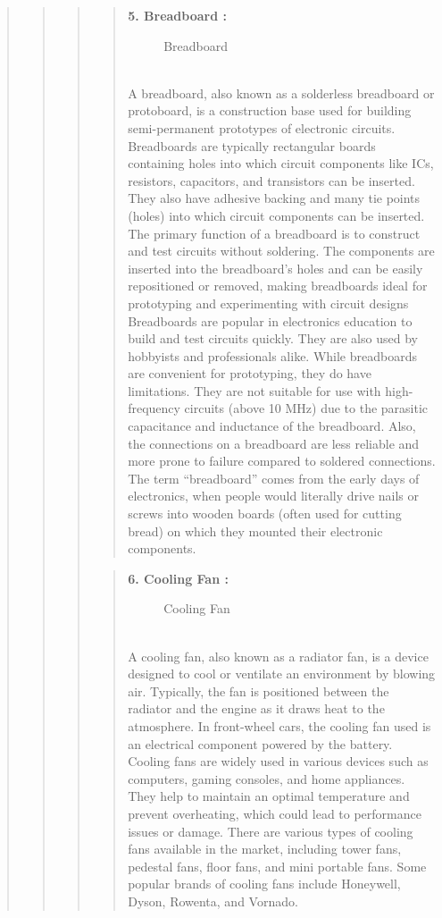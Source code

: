 \documentclass[12pt]{report}
\begin{document}
\begin{quote}
\begin{quote}
\begin{quote}
				\begin{quote}
					\textbf{5. Breadboard :}
					\begin{figure}[htbp]
						\centering
						\caption{Breadboard}
					\end{figure}
					\\A breadboard, also known as a solderless breadboard or protoboard, is a construction base used for building semi-permanent prototypes of electronic circuits. Breadboards are typically rectangular boards containing holes into which circuit components like ICs, resistors, capacitors, and transistors can be inserted. They also have adhesive backing and many tie points (holes) into which circuit components can be inserted. The primary function of a breadboard is to construct and test circuits without soldering. The components are inserted into the breadboard’s holes and can be easily repositioned or removed, making breadboards ideal for prototyping and experimenting with circuit designs Breadboards are popular in electronics education to build and test circuits quickly. They are also used by hobbyists and professionals alike. While breadboards are convenient for prototyping, they do have limitations. They are not suitable for use with high-frequency circuits (above 10 MHz) due to the parasitic capacitance and inductance of the breadboard. Also, the connections on a breadboard are less reliable and more prone to failure compared to soldered connections. The term “breadboard” comes from the early days of electronics, when people would literally drive nails or screws into wooden boards (often used for cutting bread) on which they mounted their electronic components.
				\end{quote}
				
				\begin{quote}
					\textbf{6. Cooling Fan :}
					\begin{figure}[h]
						\centering
						\caption{Cooling Fan}
						
					\end{figure}
					\\A cooling fan, also known as a radiator fan, is a device designed to cool or ventilate an environment by blowing air. Typically, the fan is positioned between the radiator and the engine as it draws heat to the atmosphere. In front-wheel cars, the cooling fan used is an electrical component powered by the battery. Cooling fans are widely used in various devices such as computers, gaming consoles, and home appliances. They help to maintain an optimal temperature and prevent overheating, which could lead to performance issues or damage. There are various types of cooling fans available in the market, including tower fans, pedestal fans, floor fans, and mini portable fans. Some popular brands of cooling fans include Honeywell, Dyson, Rowenta, and Vornado.
				\end{quote}
				

\end{quote}
\end{quote}
\end{quote}
\end{document}
